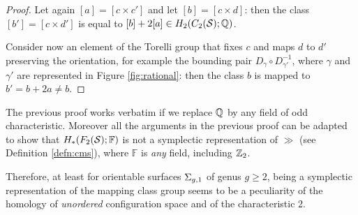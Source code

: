 \begin{proof}
Let again $[a]=[c\times c']$ and let $[b]=[c\times d]$: then the class $[b']=[c\times d']$
is equal to $[b]+2[a]\in H_2(C_2(\S);\Q)$.

Consider now an element of the Torelli group that fixes $c$ and maps $d$ to $d'$ preserving
the orientation, for example the bounding pair $D_{\gamma}\circ D_{\gamma'}^{-1}$, where
$\gamma$ and $\gamma'$ are represented in Figure \ref{fig:rational}:
then the class $b$ is mapped to $b'=b+2a\neq b$.
\end{proof}

The previous proof works verbatim if we replace $\Q$ by any field of odd characteristic. Moreover
all the arguments in the previous proof can be adapted to show that $H_*(F_2(\S);\mathbb{F})$ is
not a symplectic representation of $\gg$ (see Definition \ref{defn:cms}), where
$\mathbb{F}$ is \emph{any} field, including $\Z_2$.

Therefore, at least for orientable surfaces $\sg$ of genus $g\geq 2$,
being a symplectic representation of the mapping class group seems to be a peculiarity
of the homology of \emph{unordered} configuration space and of the characteristic 2.